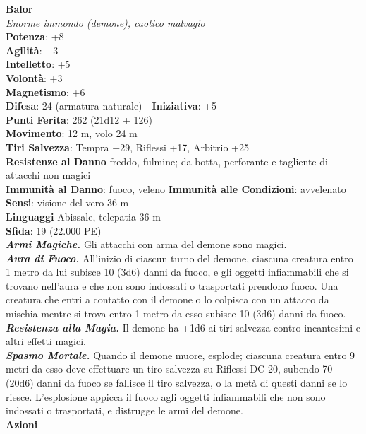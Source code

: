 \begin{multicols}{2}
\medskip\textbf{Balor}\\
\emph{Enorme immondo (demone), caotico malvagio}\\
\textbf{Potenza}: +8\\
\textbf{Agilità}: +3\\
\textbf{Intelletto}: +5\\
\textbf{Volontà}: +3\\
\textbf{Magnetismo}: +6\\
\textbf{Difesa}: 24 (armatura naturale) - \textbf{Iniziativa}: +5\\
\textbf{Punti Ferita}: 262 (21d12 + 126)\\
\textbf{Movimento}: 12 m, volo 24 m\\
\textbf{Tiri Salvezza}: Tempra +29, Riflessi +17, Arbitrio +25\\
\textbf{Resistenze al Danno} freddo, fulmine; da botta, perforante e tagliente di attacchi non magici\\ 
\textbf{Immunità al Danno}: fuoco, veleno \textbf{Immunità alle Condizioni}: avvelenato\\
\textbf{Sensi}: visione del vero 36 m\\
\textbf{Linguaggi} Abissale, telepatia 36 m\\
\textbf{Sfida}: 19 (22.000 PE)\smallskip\\
\emph{\textbf{Armi Magiche.}} Gli attacchi con arma del demone sono magici.\\
\emph{\textbf{Aura di Fuoco.}} All'inizio di ciascun turno del demone, ciascuna creatura entro 1 metro da lui subisce 10 (3d6) danni da fuoco, e gli oggetti infiammabili che si trovano nell'aura e che non sono indossati o trasportati prendono fuoco. Una creatura che entri a contatto con il demone o lo colpisca con un attacco da mischia mentre si trova entro 1 metro da esso subisce 10 (3d6) danni da fuoco.\\
\emph{\textbf{Resistenza alla Magia.}} Il demone ha +1d6 ai tiri salvezza contro incantesimi e altri effetti magici.\\
\emph{\textbf{Spasmo Mortale.}} Quando il demone muore, esplode; ciascuna creatura entro 9 metri da esso deve effettuare un tiro salvezza su Riflessi DC 20, subendo 70 (20d6) danni da fuoco se fallisce il tiro salvezza, o la metà di questi danni se lo riesce. L'esplosione appicca il fuoco agli oggetti infiammabili che non sono indossati o trasportati, e distrugge le armi del demone. \\
\smallskip\textbf{Azioni}\\

\end{multicols}
